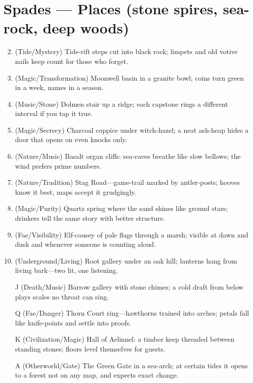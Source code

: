 \section*{Spades --- Places (stone spires, sea-rock, deep woods)}
\label{sec:aelinnel-places}
\begin{enumerate}
\setcounter{enumi}{1}
\item (Tide/Mystery) Tide-rift steps cut into black rock; limpets and old votive nails keep count for those who forget.
\item (Magic/Transformation) Moonwell basin in a granite bowl; coins turn green in a week, names in a season.
\item (Music/Stone) Dolmen stair up a ridge; each capstone rings a different interval if you tap it true.
\item (Magic/Secrecy) Charcoal coppice under witch-hazel; a neat ash-heap hides a door that opens on even knocks only.
\item (Nature/Music) Basalt organ cliffs: sea-caves breathe like slow bellows; the wind prefers prime numbers.
\item (Nature/Tradition) Stag Road---game-trail marked by antler-posts; hooves know it best, maps accept it grudgingly.
\item (Magic/Purity) Quartz spring where the sand shines like ground stars; drinkers tell the same story with better structure.
\item (Fae/Visibility) Elf-causey of pale flags through a marsh; visible at dawn and dusk and whenever someone is counting aloud.
\item (Underground/Living) Root gallery under an oak hill; lanterns hang from living bark---two lit, one listening.
\item[J] (Death/Music) Barrow gallery with stone chimes; a cold draft from below plays scales no throat can sing.
\item[Q] (Fae/Danger) Thorn Court ring---hawthorns trained into arches; petals fall like knife-points and settle into proofs.
\item[K] (Civilization/Magic) Hall of Aelinnel: a timber keep threaded between standing stones; floors level themselves for guests.
\item[A] (Otherworld/Gate) The Green Gate in a sea-arch; at certain tides it opens to a forest not on any map, and expects exact change.
\end{enumerate}

